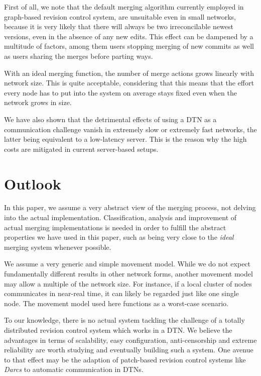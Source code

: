 \documentclass[conference,letterpaper]{IEEEtran}
\begin{document}
First of all, we note that the default merging algorithm currently employed in graph-based revision control system, are unsuitable even in small networks, because it is very likely that there will always be two irreconcilable newest versions, even in the absence of any new edits. This effect can be dampened by a multitude of factors, among them users stopping merging of new commits as well as users sharing the merges before parting ways.

With an ideal merging function, the number of merge actions grows linearly with network size. This is quite acceptable, considering that this means that the effort every node has to put into the system on average stays fixed even when the network grows in size.

We have also shown that the detrimental effects of using a DTN as a communication challenge vanish in extremely slow or extremely fast networks, the latter being equivalent to a low-latency server. This is the reason why the high costs are mitigated in current server-based setups.

\section{Outlook}

In this paper, we assume a very abstract view of the merging process, not delving into the actual implementation. Classification, analysis and improvement of actual merging implementations is needed in order to fulfill the abstract properties we have used in this paper, such as being very close to the \textit{ideal} merging system whenever possible.

We assume a very generic and simple movement model. While we do not expect fundamentally different results in other network forms, another movement model may allow a multiple of the network size. For instance, if a local cluster of nodes communicates in near-real time, it can likely be regarded just like one single node. The movement model used here functions as a worst-case scenario.

To our knowledge, there is no actual system tackling the challenge of a totally distributed revision control system which works in a DTN. We believe the advantages in terms of scalability, easy configuration, anti-censorship and extreme reliability are worth studying and eventually building such a system. One avenue to that effect may be the adaption of patch-based revision control systems like \textit{Darcs}\cite{roundy2005darcs} to automatic communication in DTNs.
\end{document}
